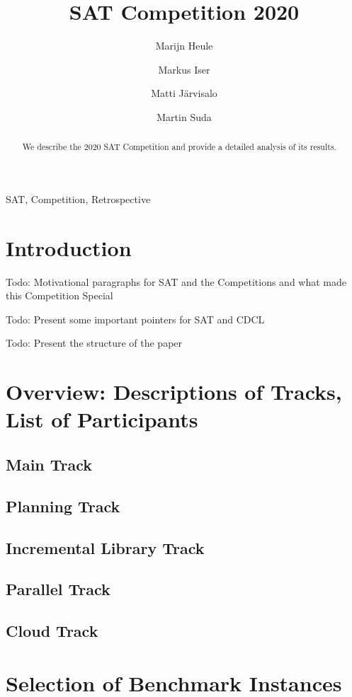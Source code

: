 \documentclass{elsarticle}
\title{SAT Competition 2020\tnoteref{title}}
\author[cmu]{Marijn Heule}
\author[kit]{Markus Iser}
\author[hiit]{Matti Järvisalo}
\author[ctu]{Martin Suda}
\newcommand{\todo}[1]{{\color{purple}Todo: #1}}
\begin{document}
\begin{abstract}
We describe the 2020 SAT Competition and provide a detailed analysis of its results.
\end{abstract}

\begin{keyword}
SAT, Competition, Retrospective
\end{keyword}

\maketitle

\section{Introduction}

\todo{Motivational paragraphs for SAT and the Competitions and what made this Competition Special}

\todo{Present some important pointers for SAT and CDCL}

\todo{Present the structure of the paper}


\section{Overview: Descriptions of Tracks, List of Participants}

\subsection{Main Track}

\subsection{Planning Track}

\subsection{Incremental Library Track}

\subsection{Parallel Track}

\subsection{Cloud Track}


\section{Selection of Benchmark Instances}
\end{document}
